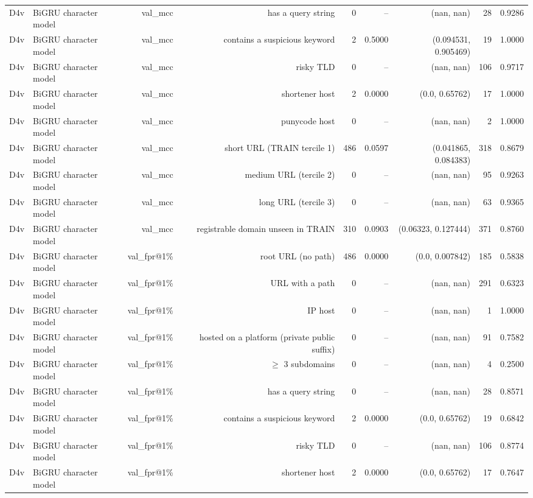 \begin{table}[t]
\begin{tabular}{llrrrrrrr}
D4v & BiGRU character model & val\_mcc & has a query string & 0 & -- & (nan, nan) & 28 & 0.9286 \\
D4v & BiGRU character model & val\_mcc & contains a suspicious keyword & 2 & 0.5000 & (0.094531, 0.905469) & 19 & 1.0000 \\
D4v & BiGRU character model & val\_mcc & risky TLD & 0 & -- & (nan, nan) & 106 & 0.9717 \\
D4v & BiGRU character model & val\_mcc & shortener host & 2 & 0.0000 & (0.0, 0.65762) & 17 & 1.0000 \\
D4v & BiGRU character model & val\_mcc & punycode host & 0 & -- & (nan, nan) & 2 & 1.0000 \\
D4v & BiGRU character model & val\_mcc & short URL (TRAIN tercile 1) & 486 & 0.0597 & (0.041865, 0.084383) & 318 & 0.8679 \\
D4v & BiGRU character model & val\_mcc & medium URL (tercile 2) & 0 & -- & (nan, nan) & 95 & 0.9263 \\
D4v & BiGRU character model & val\_mcc & long URL (tercile 3) & 0 & -- & (nan, nan) & 63 & 0.9365 \\
D4v & BiGRU character model & val\_mcc & registrable domain unseen in TRAIN & 310 & 0.0903 & (0.06323, 0.127444) & 371 & 0.8760 \\
D4v & BiGRU character model & val\_fpr@1\% & root URL (no path) & 486 & 0.0000 & (0.0, 0.007842) & 185 & 0.5838 \\
D4v & BiGRU character model & val\_fpr@1\% & URL with a path & 0 & -- & (nan, nan) & 291 & 0.6323 \\
D4v & BiGRU character model & val\_fpr@1\% & IP host & 0 & -- & (nan, nan) & 1 & 1.0000 \\
D4v & BiGRU character model & val\_fpr@1\% & hosted on a platform (private public suffix) & 0 & -- & (nan, nan) & 91 & 0.7582 \\
D4v & BiGRU character model & val\_fpr@1\% & $\geq$ 3 subdomains & 0 & -- & (nan, nan) & 4 & 0.2500 \\
D4v & BiGRU character model & val\_fpr@1\% & has a query string & 0 & -- & (nan, nan) & 28 & 0.8571 \\
D4v & BiGRU character model & val\_fpr@1\% & contains a suspicious keyword & 2 & 0.0000 & (0.0, 0.65762) & 19 & 0.6842 \\
D4v & BiGRU character model & val\_fpr@1\% & risky TLD & 0 & -- & (nan, nan) & 106 & 0.8774 \\
D4v & BiGRU character model & val\_fpr@1\% & shortener host & 2 & 0.0000 & (0.0, 0.65762) & 17 & 0.7647 \\

\end{tabular}
\end{table}
